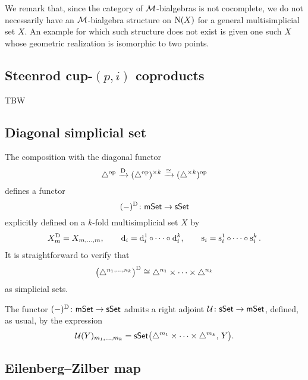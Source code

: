 We remark that, since the category of $\mathcal{M}$-bialgebras is not cocomplete, we do not necessarily have an $\mathcal{M}$-bialgebra structure on $\operatorname{N}(X)$ for a general multisimplicial set $X$.
An example for which such structure does not exist is given one such $X$ whose geometric realization is isomorphic to two points.

\subsection{Steenrod cup-$(p,i)$ coproducts}

TBW

\subsection{Diagonal simplicial set} \label{ss:diagonal simplicial set}

The composition with the diagonal functor
\[
\triangle^{\mathrm{op}} \xrightarrow{\mathrm{D}}
(\triangle^{\mathrm{op}})^{\times k} \xrightarrow{\cong}
(\triangle^{\times k})^{\mathrm{op}}
\]
defines a functor
\[
(-)^{\mathrm{D}} \colon \mathsf{mSet} \to \mathsf{sSet}
\]
explicitly defined on a $k$-fold multisimplicial set $X$ by
\begin{gather*}
	X^{\mathrm{D}}_m = X_{m, \dots, m},
	\qquad
	\operatorname{d}_i = \operatorname{d}_i^1 \circ \dots \circ \operatorname{d}_i^k,
	\qquad
	\operatorname{s}_i = \operatorname{s}_i^1 \circ \dots \circ \operatorname{s}_i^k.
\end{gather*}
It is straightforward to verify that
\[
\big(\triangle^{n_1,\dots,n_k}\big)^{\mathrm{D}} \cong
\triangle^{n_1}\times\dots\times\triangle^{n_k}
\]
as simplicial sets.

The functor $(-)^{\mathrm{D}} \colon \mathsf{mSet} \to \mathsf{sSet}$ admits a right adjoint $\operatorname{\mathcal{U}} \colon \mathsf{sSet} \to \mathsf{mSet}$, defined, as usual, by the expression
\[
\operatorname{\mathcal{U}}(Y)_{m_1,\dots,m_k} =
\mathsf{sSet}\big( \triangle^{m_1} \times \dots \times \triangle^{m_k}, \, Y \big).
\]

\subsection{Eilenberg--Zilber map}


